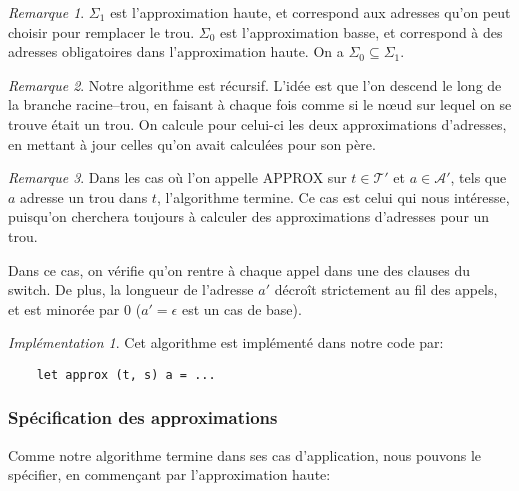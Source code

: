 \documentclass[11pt,a4paper]{article}
\theoremstyle{plain}
\theoremstyle{definition}
\theoremstyle{remark}
\newtheorem{remark}{Remarque}
\newtheorem{implementation}{Implémentation}
\newcommand*{\treeaddresses}{\ensuremath{\mathcal{A'}}}
\newcommand*{\treespartial}{\ensuremath{\mathcal{T'}}}
\newcommand*{\lowapprox}{\ensuremath{\Sigma_0}}
\newcommand*{\highapprox}{\ensuremath{\Sigma_1}}
\begin{document}
\begin{remark}
    $\highapprox$ est l'approximation haute, et correspond aux adresses qu'on peut choisir pour remplacer le trou. $\lowapprox$ est l'approximation basse, et correspond à des adresses obligatoires dans l'approximation haute.
On a $\lowapprox\subseteq\highapprox$.
\end{remark}

\begin{remark}
    \label{algo_expl}
    Notre algorithme est récursif. L'idée est que l'on descend le long de la branche racine--trou, en faisant à chaque fois comme si le n\oe ud sur lequel on se trouve était un trou. On calcule pour celui-ci les deux approximations d'adresses, en mettant à jour celles qu'on avait calculées pour son père.
\end{remark}

\begin{remark}
    Dans les cas où l'on appelle APPROX sur $t \in \treespartial$ et $a \in \treeaddresses$, tels que $a$ adresse un trou dans $t$, l'algorithme termine. Ce cas est celui qui nous intéresse, puisqu'on cherchera toujours à calculer des approximations d'adresses pour un trou.
    
    Dans ce cas, on vérifie qu'on rentre à chaque appel dans une des clauses du switch. De plus, la longueur de l'adresse $a'$ décroît strictement au fil des appels, et est minorée par 0 ($a' = \epsilon$ est un cas de base).
\end{remark}

\begin{implementation}
    Cet algorithme est implémenté dans notre code par:
    \begin{verbatim}
    let approx (t, s) a = ...
    \end{verbatim}
\end{implementation}

\subsubsection{Spécification des approximations}

Comme notre algorithme termine dans ses cas d'application, nous pouvons le spécifier, en commençant par l'approximation haute:
\end{document}
